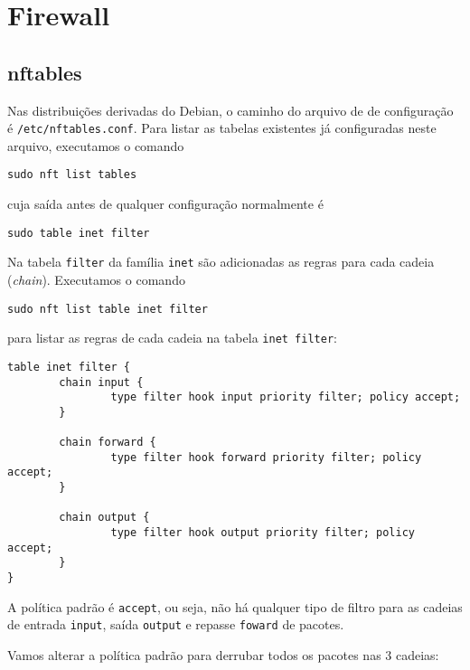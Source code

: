 \lstset{style=mybash}

\section*{Firewall}


\subsection*{nftables}

Nas distribuições derivadas do Debian, o caminho do arquivo de de
configuração é {\tt /etc/nftables.conf}. Para listar as tabelas
existentes já configuradas neste arquivo, executamos o comando

\begin{lstlisting}
sudo nft list tables
\end{lstlisting}
  
\noindent cuja saída antes de qualquer configuração normalmente é

\begin{lstlisting}
sudo table inet filter
\end{lstlisting}

Na tabela {\tt filter} da família {\tt inet} são adicionadas as regras
para cada cadeia ({\em chain}). Executamos o comando

\begin{lstlisting}
sudo nft list table inet filter
\end{lstlisting}

\noindent para listar as regras de cada cadeia na tabela {\tt inet
  filter}:

\begin{lstlisting}
table inet filter {
        chain input {
                type filter hook input priority filter; policy accept;
        }

        chain forward {
                type filter hook forward priority filter; policy accept;
        }

        chain output {
                type filter hook output priority filter; policy accept;
        }
}
\end{lstlisting}

A política padrão é {\tt accept}, ou seja, não há qualquer tipo de
filtro para as cadeias de entrada {\tt input}, saída {\tt output} e
repasse {\tt foward} de pacotes.

Vamos alterar a política padrão para derrubar todos os pacotes nas 3
cadeias:

